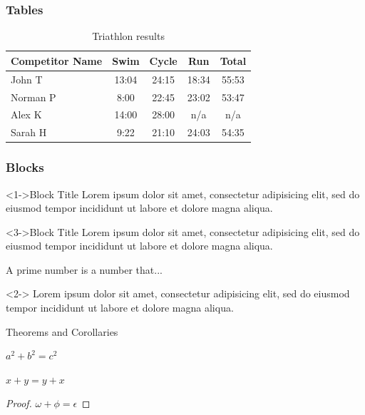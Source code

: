 \documentclass{beamer}
\begin{document}
\begin{frame}
	\frametitle{Tables}
	\begin{table}
		\centering
		\begin{tabular}{l | c | c | c | c }
			Competitor Name & Swim  & Cycle & Run   & Total \\
			\hline \hline
			John T          & 13:04 & 24:15 & 18:34 & 55:53 \\
			Norman P        & 8:00  & 22:45 & 23:02 & 53:47 \\
			Alex K          & 14:00 & 28:00 & n/a   & n/a   \\
			Sarah H         & 9:22  & 21:10 & 24:03 & 54:35
		\end{tabular}
		\caption{Triathlon results}
	\end{table}

\end{frame}

\begin{frame}
	\frametitle{Blocks}
	\begin{block}<1->{Block Title}
		Lorem ipsum dolor sit amet, consectetur adipisicing elit,
		sed do eiusmod tempor incididunt ut labore et
		dolore magna aliqua.
	\end{block}
	\begin{alertblock}<3->{Block Title}
		Lorem ipsum dolor sit amet, consectetur adipisicing elit,
		sed do eiusmod tempor incididunt ut labore et
		dolore magna aliqua.
	\end{alertblock}
	\begin{definition}
		A prime number is a number that...
	\end{definition}
	\begin{example}<2->
		Lorem ipsum dolor sit amet, consectetur adipisicing elit,
		sed do eiusmod tempor incididunt ut labore et
		dolore magna aliqua.
	\end{example}
\end{frame}


\begin{frame}{Theorems and Corollaries}

	\begin{theorem}[Pythagoras]
		$ a^2 + b^2 = c^2$
	\end{theorem}
	\begin{corollary}
		$ x + y = y + x  $
	\end{corollary}
	\begin{proof}
		$\omega +\phi = \epsilon $
	\end{proof}
\end{frame}
\end{document}
